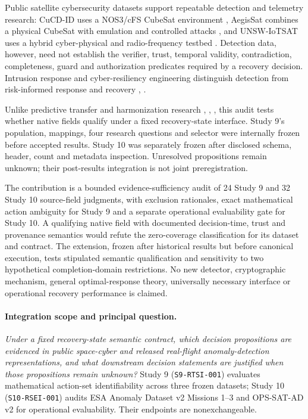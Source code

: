 \documentclass[preprint,12pt]{elsarticle}
\begin{document}
Public satellite cybersecurity datasets support repeatable detection and telemetry research: CuCD-ID uses a NOS3/cFS CubeSat environment \cite{fayyaz2026cucd}, AegisSat combines a physical CubeSat with emulation and controlled attacks \cite{idan2025aegissat}, and UNSW-IoTSAT uses a hybrid cyber-physical and radio-frequency testbed \cite{abdelhameed2026unsw}. Detection data, however, need not establish the verifier, trust, temporal validity, contradiction, completeness, guard and authorization predicates required by a recovery decision. Intrusion response and cyber-resiliency engineering distinguish detection from risk-informed response and recovery \cite{bashendy2023irs}, \cite{ross2021cyberresilient}.

Unlike predictive transfer and harmonization research \cite{koh2021wilds}, \cite{cerasuolo2026transfer}, \cite{rodriguez2026harmonization}, this audit tests whether native fields qualify under a fixed recovery-state interface. Study 9's population, mappings, four research questions and selector were internally frozen before accepted results. Study 10 was separately frozen after disclosed schema, header, count and metadata inspection. Unresolved propositions remain unknown; their post-results integration is not joint preregistration.

The contribution is a bounded evidence-sufficiency audit of 24 Study 9 and 32 Study 10 source-field judgments, with exclusion rationales, exact mathematical action ambiguity for Study 9 and a separate operational evaluability gate for Study 10. A qualifying native field with documented decision-time, trust and provenance semantics would refute the zero-coverage classification for its dataset and contract. The extension, frozen after historical results but before canonical execution, tests stipulated semantic qualification and sensitivity to two hypothetical completion-domain restrictions. No new detector, cryptographic mechanism, general optimal-response theory, universally necessary interface or operational recovery performance is claimed.

\paragraph{Integration scope and principal question.}
\emph{Under a fixed recovery-state semantic contract, which decision propositions are evidenced in public space-cyber and released real-flight anomaly-detection representations, and what downstream decision statements are justified when those propositions remain unknown?} Study 9 (\texttt{S9-RTSI-001}) evaluates mathematical action-set identifiability across three frozen datasets; Study 10 (\texttt{S10-RSEI-001}) audits ESA Anomaly Dataset v2 Missions 1--3 \cite{esaad2025v2} and OPS-SAT-AD v2 \cite{opssat2024v2} for operational evaluability. Their endpoints are nonexchangeable.
\end{document}
